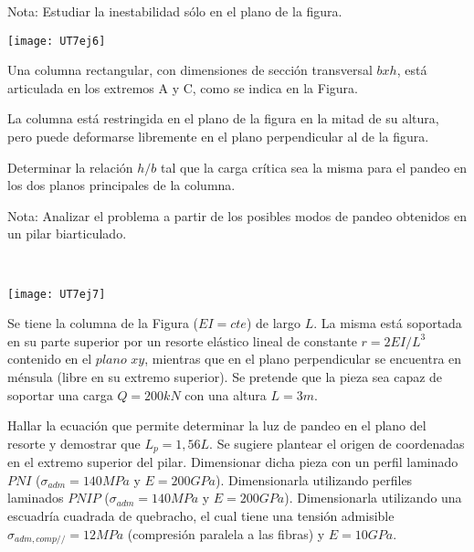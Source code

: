 Nota: Estudiar la inestabilidad sólo en el plano de la figura.

\begin{center}
\texttt{[image: UT7ej6]}
\end{center}

\ejercicio

\begin{minipage}[b]{0.6\textwidth}

Una columna rectangular, con dimensiones de sección transversal $bxh$, está articulada en los extremos A y C, como se indica en la Figura.

La columna está restringida en el plano de la figura en la mitad de su altura, pero puede deformarse libremente en el plano perpendicular al de la figura.

Determinar la relación $h/b$ tal que la carga crítica sea la misma para el pandeo en los dos planos principales de la columna.

Nota: Analizar el problema a partir de los posibles modos de pandeo obtenidos en un pilar biarticulado.

\end{minipage}
~
\begin{minipage}[b]{0.4\textwidth}
\begin{center}
\texttt{[image: UT7ej7]}
\end{center}
\end{minipage}

\ejercicio

Se tiene la columna de la Figura ($EI=cte$) de largo $L$. La misma está soportada en su parte superior por un resorte elástico lineal de constante $r=2EI/L^3$ contenido en el $plano$ $xy$, mientras que en el plano perpendicular se encuentra en ménsula (libre en su extremo superior). Se pretende que la pieza sea capaz de soportar una carga $Q=200 kN$ con una altura $L=3m$.

\parte Hallar la ecuación que permite determinar la luz de pandeo en el plano del resorte y demostrar que $L_p=1,56L$. Se sugiere plantear el origen de coordenadas en el extremo superior del pilar.
\parte Dimensionar dicha pieza con un perfil laminado $PNI$ ($\sigma_{adm}=140MPa$ y $E=200GPa$).
\parte Dimensionarla utilizando perfiles laminados $PNIP$ ($\sigma_{adm}=140MPa$ y $E=200GPa$). 
\parte Dimensionarla utilizando una escuadría cuadrada de quebracho, el cual tiene una tensión admisible $\sigma_{adm,comp//}=12MPa$ (compresión paralela a las fibras) y $E=10GPa$.


